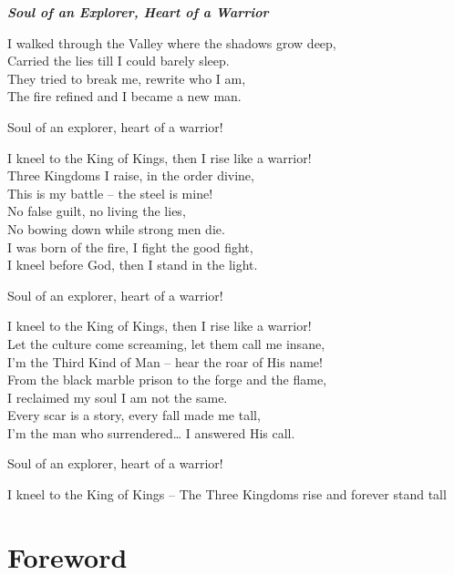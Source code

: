 \documentclass[12pt,a4paper]{book}
\begin{document}
\thispagestyle{empty}
\begin{center}
  \vspace*{8cm}
  {\itshape
\textbf{Soul of an Explorer, Heart of a Warrior}

I walked through the Valley where the shadows grow deep,\\
Carried the lies till I could barely sleep.\\
They tried to break me, rewrite who I am,\\
The fire refined and I became a new man.

Soul of an explorer, heart of a warrior!

I kneel to the King of Kings, then I rise like a warrior!\\
Three Kingdoms I raise, in the order divine,\\
This is my battle -- the steel is mine!\\
No false guilt, no living the lies,\\
No bowing down while strong men die.\\
I was born of the fire, I fight the good fight,\\
I kneel before God, then I stand in the light.

Soul of an explorer, heart of a warrior!

I kneel to the King of Kings, then I rise like a warrior!\\
Let the culture come screaming, let them call me insane,\\
I’m the Third Kind of Man -- hear the roar of His name!\\
From the black marble prison to the forge and the flame,\\
I reclaimed my soul I am not the same.\\
Every scar is a story, every fall made me tall,\\
I’m the man who surrendered… I answered His call.

Soul of an explorer, heart of a warrior!

I kneel to the King of Kings -- The Three Kingdoms rise and forever stand tall
  }
\end{center}
\clearpage

\chapter*{Foreword}

\end{document}
